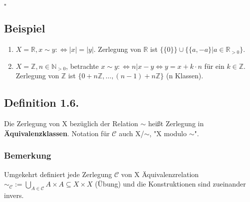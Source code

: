 \documentclass[a4paper,twoside]{article}
\begin{document}
\begin{flushleft}
$\square$\\
\end{flushleft}

\subsection*{Beispiel}
\begin{enumerate}[label=(\alph*)]
\item $X = \mathbb{R}, x \sim y :\Leftrightarrow |x| = |y|$.
Zerlegung von $\mathbb{R}$ ist $\{\{0\}\} \cup \{\{a, -a\} | a \in \mathbb{R}_{>0}\}$.
\item $X = \mathbb{Z}, n \in \mathbb{N}_{>0}$, betrachte $x \sim y :\Leftrightarrow n | x - y \Leftrightarrow y = x + k \cdot n$ für ein $k \in \mathbb{Z}$.
Zerlegung von $\mathbb{Z}$ ist $\{0 + n\mathbb{Z},\ldots, (n - 1) + n\mathbb{Z}\}$ (n Klassen).
\end{enumerate}

\subsection*{Definition 1.6.}
Die Zerlegung von X bezüglich der Relation $\sim$ heißt Zerlegung in \textbf{Äquivalenzklassen}. Notation für $\mathcal{C}$ auch X/$\sim$, "X modulo $\sim$".
\subsubsection*{Bemerkung}
Umgekehrt definiert jede Zerlegung $\mathcal{C}$ von X Äquivalenzrelation $\sim_\mathcal{C} := \bigcup_{A \in \mathcal{C}} A \times A \subseteq X \times X$ (Übung) und die Konstruktionen sind zueinander invers.
\end{document}
